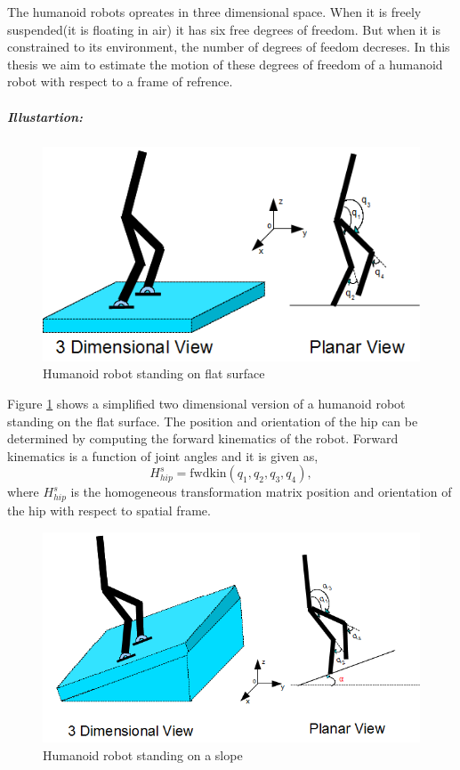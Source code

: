    The humanoid robots opreates in three dimensional space. When it is freely suspended(it is floating in air) it has six free degrees of freedom. But when it is constrained to its environment, the number of degrees of feedom decreses. In this thesis we aim to estimate the motion of these degrees of freedom of a humanoid robot with respect to a frame of refrence.   
\subparagraph{Illustartion:}    
     \begin{figure}[h]
	    \centering
    	\includegraphics[scale=0.75]{Bilder/robot_flatfloor}
	    \caption{Humanoid robot standing on flat surface}	
	    \label{fig:flat_floor}
    \end{figure}
   Figure \ref{fig:flat_floor} shows a simplified two dimensional version of a humanoid robot standing on the flat surface. The position and orientation of the hip can be determined by computing the forward kinematics of the robot. Forward kinematics is a function of joint angles and it is given as,
    \begin{equation}
    \label{eq:fwkin_flat}
    H_{hip}^s = \text{fwdkin}(q_1,q_2,q_3,q_4),
    \end{equation}
    where $H_{hip}^s$ is the homogeneous transformation matrix position and orientation of the hip with respect to spatial frame. 
    \begin{figure}[h]
	    \centering
    	\includegraphics[scale=0.65]{Bilder/robot_slope}
	    \caption{Humanoid robot standing on a slope}	
	    \label{fig:slope}
    \end{figure}
